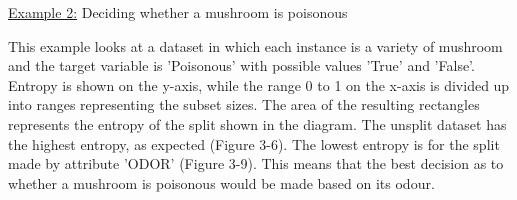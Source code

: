   \underline{Example 2:} Deciding whether a mushroom is poisonous
    
    This example looks at a dataset in which each instance is a variety of mushroom and the target variable is 'Poisonous' with possible values 'True' and 'False'. Entropy is shown on the y-axis, while the range 0 to 1 on the x-axis is divided up into ranges representing the subset sizes. The area of the resulting rectangles represents the entropy of the split shown in the diagram. The unsplit dataset has the highest entropy, as expected (Figure 3-6). The lowest entropy is for the split made by attribute 'ODOR' (Figure 3-9). This means that the best decision as to whether a mushroom is poisonous would be made based on its odour.

